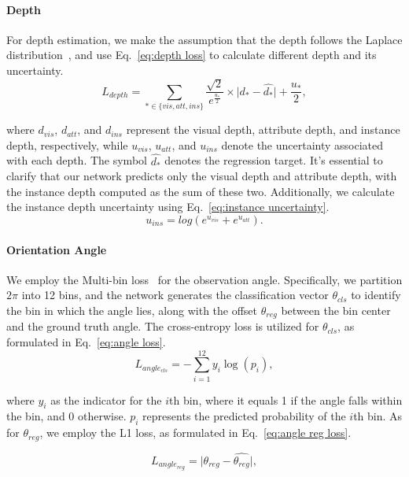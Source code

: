 \documentclass[journal]{IEEEtran}
\begin{document}
	\paragraph{Depth}
	For depth estimation, we make the assumption that the depth follows the Laplace distribution~\cite{didm3d}, and use Eq.~\eqref{eq:depth loss} to calculate different depth and its uncertainty. 
	\begin{equation} 
		L_{depth} = \sum_{*\in \{vis, att, ins\}} \frac{\sqrt{2}}{e^{\frac{u_*}{2}}} \times \lvert d_* - \hat{d_*} \rvert + \frac{u_*}{2}
		\label{eq:depth loss}, 
	\end{equation}
	
	where $d_{vis}$, $d_{att}$, and $d_{ins}$ represent the visual depth, attribute depth, and instance depth, respectively, while $u_{vis}$, $u_{att}$, and $u_{ins}$ denote the uncertainty associated with each depth. The symbol $\hat{d_*}$ denotes the regression target. It's essential to clarify that our network predicts only the visual depth and attribute depth, with the instance depth computed as the sum of these two. Additionally, we calculate the instance depth uncertainty using Eq.~\eqref{eq:instance uncertainty}.
	\begin{equation} 
		u_{ins} = log(e^{u_{vis}} + e^{u_{att}})
		\label{eq:instance uncertainty}.
	\end{equation}
	\paragraph{Orientation Angle}
	We employ the Multi-bin loss~\cite{geometry3d} for the observation angle. Specifically, we partition $2 \pi$ into 12 bins, and the network generates the classification vector $\theta_{cls}$ to identify the bin in which the angle lies, along with the offset $\theta_{reg}$ between the bin center and the ground truth angle. The cross-entropy loss is utilized for $\theta_{cls}$, as formulated in Eq.~\eqref{eq:angle loss}.
	\begin{equation} 
		L_{angle_{cls}} = -\sum_{i=1}^{12} y_{i}\log(p_{i}), 
		\label{eq:angle loss}
	\end{equation}
	
	where $y_i$ as the indicator for the $i$th bin, where it equals 1 if the angle falls within the bin, and 0 otherwise. $p_i$ represents the predicted probability of the $i$th bin. As for $\theta_{reg}$, we employ the L1 loss, as formulated in Eq.~\eqref{eq:angle reg loss}.
	
	
	\begin{equation} 
		L_{angle_{reg}} = \lvert \theta_{reg} - \hat{\theta_{reg}} \rvert, 
		\label{eq:angle reg loss}
	\end{equation}
	
\end{document}
